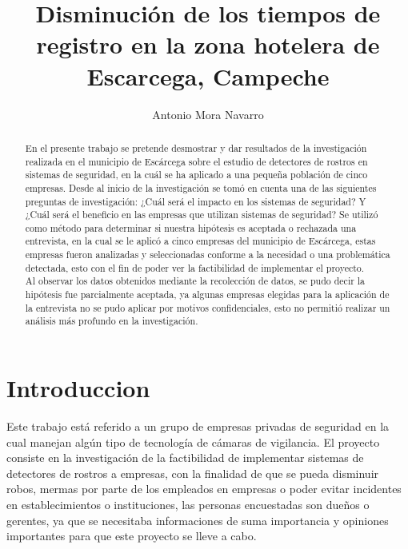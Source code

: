 \documentclass{comjnl}
\begin{document}
\title[ARTICULO DE INVESTIGACION]{Disminución de los tiempos de registro en la zona hotelera de Escarcega, Campeche }

\author{Antonio Mora Navarro}

 





\begin{abstract}
En el presente trabajo  se pretende desmostrar y dar resultados de la investigación realizada en el municipio de Escárcega sobre el estudio de detectores de rostros en sistemas de seguridad, en la cuál se ha aplicado a una pequeña población de cinco empresas. Desde al inicio de la investigación se tomó en cuenta una de las siguientes  preguntas de investigación: ¿Cuál será el impacto en los sistemas de seguridad? Y ¿Cuál será el beneficio en las empresas que utilizan sistemas de seguridad?
Se utilizó como método para determinar si nuestra hipótesis es aceptada o rechazada una entrevista, en la cual se le aplicó a cinco empresas del municipio de Escárcega, estas empresas fueron analizadas y seleccionadas conforme a la necesidad o una problemática detectada, esto con el fin de poder ver la factibilidad de implementar el proyecto.\\
Al observar los datos obtenidos mediante la recolección de datos, se pudo decir la hipótesis fue parcialmente aceptada, ya algunas empresas elegidas para la aplicación de la entrevista no se pudo aplicar por motivos confidenciales, esto no permitió realizar un análisis más profundo en la investigación.\\


\end{abstract}

\maketitle


\section{Introduccion}

Este trabajo está referido a un grupo de empresas privadas de seguridad en la cual manejan algún tipo de tecnología  de cámaras de vigilancia. El proyecto consiste en la investigación de la factibilidad de implementar sistemas de detectores de rostros a empresas, con la finalidad de que se pueda disminuir robos, mermas por parte de los empleados en empresas o poder evitar incidentes en establecimientos o instituciones, las personas encuestadas son dueños o gerentes, ya que se necesitaba informaciones de suma importancia y opiniones importantes para que este proyecto se lleve a cabo.
\end{document}
